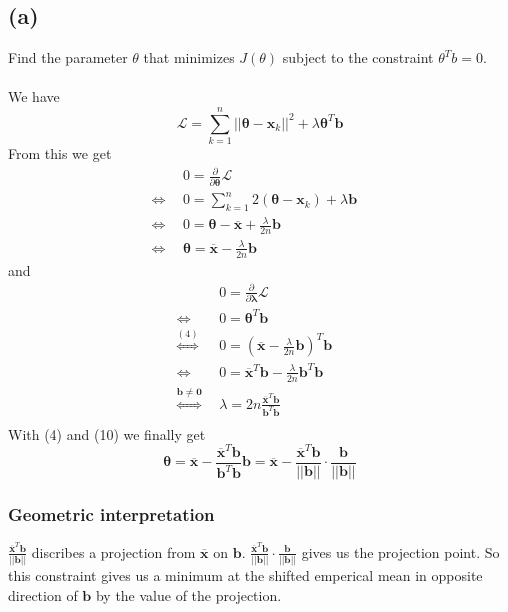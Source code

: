 \documentclass{article}
\newcommand{\PartDiv}[1]{\frac{\partial}{\partial #1}}
\begin{document}
\subsection*{(a)}
Find the parameter $\theta$ that minimizes $J(\theta)$ subject to the constraint $\theta^T b = 0$.\\ \\
We have
$$
\mathcal{L} = \sum \limits _{k=1}^n ||\boldsymbol{\theta} - \boldsymbol{x}_k||^2 + \lambda \boldsymbol{\theta}^T\boldsymbol{b}
$$
From this we get
\begin{align}
&0 = \PartDiv{\boldsymbol{\theta}} \mathcal{L}&\\
\Leftrightarrow~~&0 = \sum \limits _{k=1}^n 2(\boldsymbol{\theta} - \boldsymbol{x}_k) + \lambda \boldsymbol{b}&\\ 
\Leftrightarrow~~&0= \boldsymbol{\theta} - \overline{\boldsymbol{x}} + \frac{\lambda}{2n} \boldsymbol{b}&\\
\Leftrightarrow~~&\boldsymbol{\theta} = \overline{\boldsymbol{x}} - \frac{\lambda}{2n} \boldsymbol{b}&
\end{align}
and
\begin{align}
&0 = \PartDiv{\boldsymbol{\lambda}} \mathcal{L}&\\
\Leftrightarrow~~&0 =  \boldsymbol{\theta}^T \boldsymbol{b}&\\ 
\stackrel{(4)}{\Leftrightarrow}~~&0= (\overline{\boldsymbol{x}} - \frac{\lambda}{2n} \boldsymbol{b})^T \boldsymbol{b}&\\
\Leftrightarrow~~&0= \overline{\boldsymbol{x}}^T\boldsymbol{b} - \frac{\lambda}{2n} \boldsymbol{b}^T \boldsymbol{b}&\\
\stackrel{\boldsymbol{b} \neq \boldsymbol{0}}{\Leftrightarrow}~~&\lambda = 2n \frac {\overline{\boldsymbol{x}}^T\boldsymbol{b}}{\boldsymbol{b}^T \boldsymbol{b}}&\\
\end{align}
With (4) and (10) we finally get
$$
\boldsymbol{\theta} = \overline{\boldsymbol{x}} - \frac {\overline{\boldsymbol{x}}^T\boldsymbol{b}}{\boldsymbol{b}^T \boldsymbol{b}} \boldsymbol{b} 
=\overline{\boldsymbol{x}} - \frac {\overline{\boldsymbol{x}}^T\boldsymbol{b}}{||\boldsymbol{b}||} \cdot \frac{\boldsymbol{b}}{||\boldsymbol{b}||}  
$$
\subsubsection*{Geometric interpretation}
$\frac {\overline{\boldsymbol{x}}^T\boldsymbol{b}}{||\boldsymbol{b}||}$ discribes a projection from $\boldsymbol{\overline{x}}$ on $\boldsymbol{b}$.
$\frac {\overline{\boldsymbol{x}}^T\boldsymbol{b}}{||\boldsymbol{b}||}\cdot \frac{\boldsymbol{b}}{||\boldsymbol{b}||}$ gives us the projection point. 
So this constraint gives us a minimum at the shifted emperical mean in opposite direction of $\boldsymbol{b}$ by the value of the projection.
\end{document}
